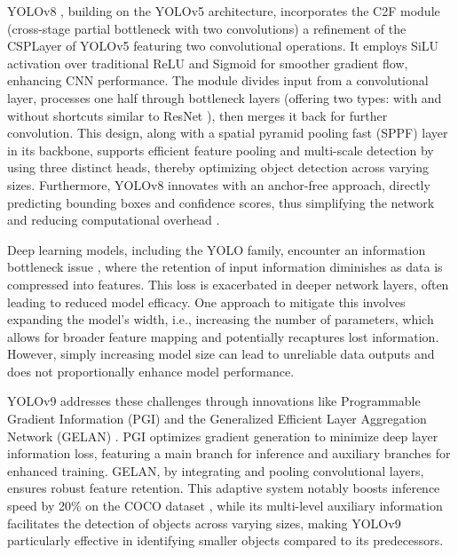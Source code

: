 


YOLOv8 \cite{ultralyticsYOLOv8}, building on the YOLOv5 \cite{Jocher2020YOLOv5} architecture, incorporates the C2F module (cross-stage partial bottleneck with two convolutions) a refinement of the CSPLayer of YOLOv5 featuring two convolutional operations. It employs SiLU activation over traditional ReLU and Sigmoid \cite{elfwing2018sigmoid} for smoother gradient flow, enhancing CNN performance. The module divides input from a convolutional layer, processes one half through bottleneck layers (offering two types: with and without shortcuts similar to ResNet \cite{targ2016resnet}), then merges it back for further convolution. This design, along with a spatial pyramid pooling fast (SPPF) layer in its backbone, supports efficient feature pooling and multi-scale detection by using three distinct heads, thereby optimizing object detection across varying sizes. Furthermore, YOLOv8 innovates with an anchor-free approach, directly predicting bounding boxes and confidence scores, thus simplifying the network and reducing computational overhead \cite{law2018cornernet,duan2019centernet,tian2019fcos}.

Deep learning models, including the YOLO family, encounter an information bottleneck issue \cite{tishby2015deep,tishby2000information}, where the retention of input information diminishes as data is compressed into features. This loss is exacerbated in deeper network layers, often leading to reduced model efficacy. One approach to mitigate this involves expanding the model's width, i.e., increasing the number of parameters, which allows for broader feature mapping and potentially recaptures lost information. However, simply increasing model size can lead to unreliable data outputs and does not proportionally enhance model performance.

YOLOv9 addresses these challenges through innovations like Programmable Gradient Information (PGI) and the Generalized Efficient Layer Aggregation Network (GELAN) \cite{wang2024yolov9}. PGI optimizes gradient generation to minimize deep layer information loss, featuring a main branch for inference and auxiliary branches for enhanced training. GELAN, by integrating and pooling convolutional layers, ensures robust feature retention. This adaptive system notably boosts inference speed by 20\% \cite{wang2024yolov9}on the COCO dataset \cite{lin2014microsoft}, while its multi-level auxiliary information facilitates the detection of objects across varying sizes, making YOLOv9 particularly effective in identifying smaller objects compared to its predecessors.








